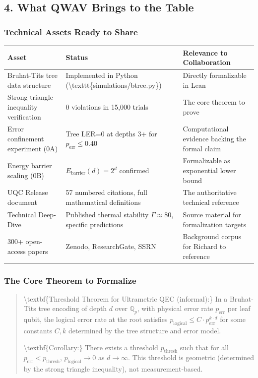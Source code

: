 \documentclass[11pt,a4paper]{article}
\begin{document}
\subsection{4. What QWAV Brings to the Table}


\subsubsection{Technical Assets Ready to Share}


\begin{tabular}{|l|l|l|}
\hline
\textbf{Asset} & \textbf{Status} & \textbf{Relevance to Collaboration} \\
\hline
Bruhat-Tits tree data structure & Implemented in Python (\textbackslash{}texttt\{simulations/btree.py\}) & Directly formalizable in Lean \\
\hline
Strong triangle inequality verification & 0 violations in 15,000 trials & The core theorem to prove \\
\hline
Error confinement experiment (0A) & Tree LER=0 at depths 3+ for $p_{\text{err}} \leq 0.40$ & Computational evidence backing the formal claim \\
\hline
Energy barrier scaling (0B) & $E_{\text{barrier}}(d) = 2^d$ confirmed & Formalizable as exponential lower bound \\
\hline
UQC Release document & 57 numbered citations, full mathematical definitions & The authoritative technical reference \\
\hline
Technical Deep-Dive & Published thermal stability $\Gamma \approx 80$, specific predictions & Source material for formalization targets \\
\hline
300+ open-access papers & Zenodo, ResearchGate, SSRN & Background corpus for Richard to reference \\
\hline
\end{tabular}


\subsubsection{The Core Theorem to Formalize}


\begin{quote}
\textbackslash{}textbf\{Threshold Theorem for Ultrametric QEC (informal):\}
In a Bruhat-Tits tree encoding of depth $d$ over $\mathbb{Q}_p$, with physical error rate $p_{\text{err}}$ per leaf qubit, the logical error rate at the root satisfies $p_{\text{logical}} \leq C \cdot p_{\text{err}}^{k \cdot d}$ for some constants $C, k$ determined by the tree structure and error model.

\textbackslash{}textbf\{Corollary:\} There exists a threshold $p_{\text{thresh}}$ such that for all $p_{\text{err}} < p_{\text{thresh}}$, $p_{\text{logical}} \to 0$ as $d \to \infty$. This threshold is geometric (determined by the strong triangle inequality), not measurement-based.
\end{quote}
\end{document}
